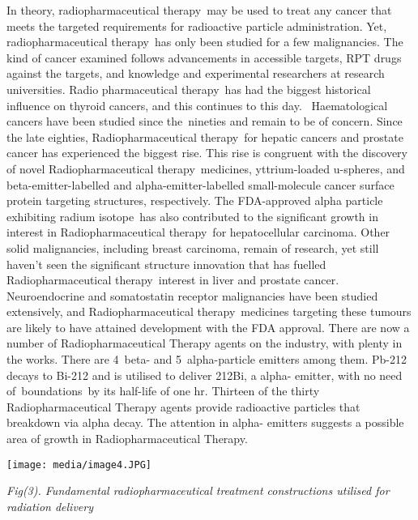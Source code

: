 \documentclass[
]{article}
\begin{document}
In theory, radiopharmaceutical therapy~may be used to treat any cancer
that meets the targeted requirements for radioactive particle
administration. Yet, radiopharmaceutical therapy~has only been studied
for a few malignancies. The kind of cancer examined follows advancements
in accessible targets, RPT drugs against the targets, and knowledge and
experimental researchers at research universities. Radio pharmaceutical
therapy~has had the biggest historical influence on thyroid cancers, and
this continues to this day.~ Haematological cancers have been studied
since the~nineties and remain to be of concern. Since the late eighties,
Radiopharmaceutical therapy~for hepatic cancers and prostate cancer has
experienced the biggest rise. This rise is congruent with the discovery
of novel Radiopharmaceutical therapy~medicines, yttrium-loaded
u-spheres, and beta-emitter-labelled and alpha-emitter-labelled
small-molecule cancer surface protein targeting structures,
respectively. The FDA-approved alpha particle exhibiting radium
isotope~has also contributed to the significant growth in interest in
Radiopharmaceutical therapy~for hepatocellular carcinoma. Other solid
malignancies, including breast carcinoma, remain of research, yet still
haven't seen the significant structure innovation that has fuelled
Radiopharmaceutical therapy~interest in liver and prostate cancer.
Neuroendocrine and somatostatin receptor malignancies have been studied
extensively, and Radiopharmaceutical therapy~medicines targeting these
tumours are likely to have attained development with the FDA approval.
There are now a number of Radiopharmaceutical Therapy agents on the
industry, with plenty in the works. There are 4~beta- and
5~alpha-particle emitters among them. Pb-212 decays to Bi-212 and is
utilised to deliver 212Bi, a alpha- emitter, with no need
of~boundations~by its half-life of one hr. Thirteen of the thirty
Radiopharmaceutical Therapy agents provide radioactive particles that
breakdown via alpha decay. The attention in alpha- emitters suggests a
possible area of growth in Radiopharmaceutical Therapy.

\texttt{[image: media/image4.JPG]}

\emph{Fig(3). Fundamental radiopharmaceutical treatment constructions
utilised for radiation delivery}
\end{document}
